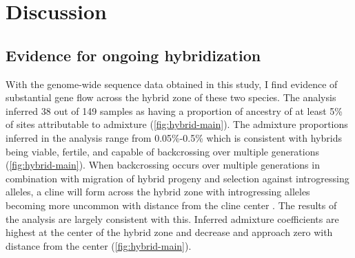 \section{Discussion}
\subsection{Evidence for ongoing hybridization}

With the genome-wide sequence data obtained in this study, I find evidence of
substantial gene flow across the hybrid zone of these two species.
The \structure analysis inferred 38 out of 149 samples as having a proportion of 
ancestry of at least 5\% of sites attributable to admixture (\cref{fig:hybrid-main}). 
The admixture proportions inferred in the \structure analysis range 
from 0.05\%-0.5\% which is consistent with hybrids being viable, fertile, and 
capable of backcrossing over multiple generations \citationNeeded (\cref{fig:hybrid-main}). 
When backcrossing occurs over multiple generations in combination with migration
of hybrid progeny and selection against introgressing alleles, a cline will form 
across the hybrid zone with introgressing alleles becoming more uncommon with
distance from the cline center \parencite{barton1985}.
The results of the \structure analysis are largely consistent with this.
Inferred admixture coefficients are highest at the center of the hybrid zone 
and decrease and approach zero with distance from the center (\cref{fig:hybrid-main}).

